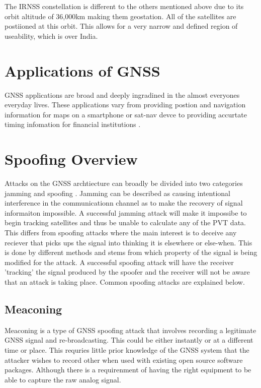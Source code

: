 The IRNSS constellation is different to the others mentioned above due to its orbit altitude of 36,000km making them geostation. All of the satellites are postiioned at
this orbit. This allows for a very narrow and defined region of useability, which is over India. 

\section{Applications of GNSS} \label{sec:ApplicationsGNSS}
GNSS applications are broad and deeply ingradined in the almost everyones everyday lives. These applications vary from providing postion and navigation information for
maps on a smartphone or sat-nav devce to providing accurtate timing infomation for financial institutions \cite{RN33}.

\section{Spoofing Overview}
Attacks on the GNSS archtiecture can broadly be divided into two categories jamming and spoofing \cite{RN33} \cite{RN32}. Jamming can be described as causing intentional
interference in the communicationn channel as to make the recovery of signal informaiton impossible. A successful jamming attack will make it impossibe to begin tracking
satellites and thus be unable to calculate any of the PVT data. This differs from spoofing attacks where the main interest is to deceive any reciever that picks ups the
signal into thinking it is elsewhere or else-when. This is done by different methods and stems from which property of the signal is being modified for the attack. A
successful spoofing attack will have the receiver 'tracking' the signal produced by the spoofer and the receiver will not be aware that an attack is taking place. Common
spoofing attacks are explained below.

\subsection{Meaconing}
Meaconing is a type of GNSS spoofing attack that involves recording a legitimate GNSS signal and re-broadcasting. This could be either instantly or at a different time or
place. This requries little prior knowledge of the GNSS system that the attacker wishes to record other when used with existing open source software packages. Although
there is a requirenment of having the right equipment to be able to capture the raw analog signal.

